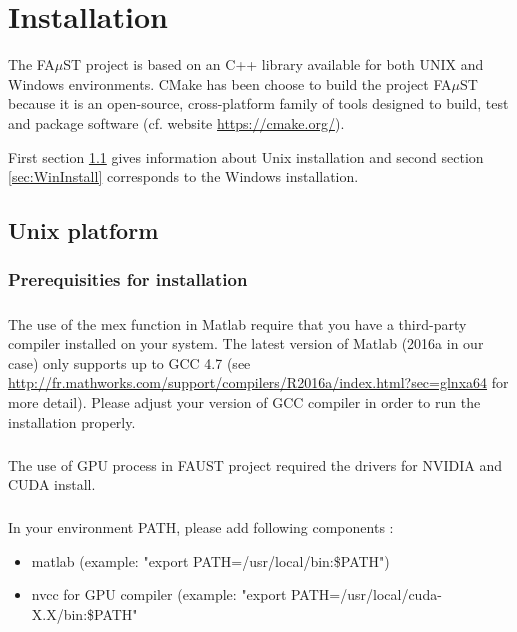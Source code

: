 \chapter{Installation}\label{sec:install}

The FA$\mu$ST project is based on an C++ library available for both UNIX and Windows environments. CMake has been choose to build the project FA$\mu$ST because it is an open-source, cross-platform family of tools designed to build, test and package software (cf. website \url{https://cmake.org/}).

First section \ref{sec:UnixInstall} gives information about Unix installation and second section \ref{sec:WinInstall} corresponds to the Windows installation. 

\section{Unix platform}\label{sec:UnixInstall}

\subsection{Prerequisities for installation}\label{sec:UnixPrerequisitiesInstall}
  

\paragraph{}The use of the mex function in Matlab require that you have a third-party compiler installed on your system. The latest version of Matlab (2016a in our case) only supports up to GCC 4.7 (see \url{http://fr.mathworks.com/support/compilers/R2016a/index.html?sec=glnxa64} for more detail). Please adjust your version of GCC compiler in order to run the installation properly. 

\paragraph{}The use of GPU process in FAUST project required the drivers for NVIDIA and CUDA install.


\paragraph{}In your environment PATH, please add following components :
\begin{itemize}
\item matlab (example: "export PATH=/usr/local/bin:\$PATH")
\item nvcc for GPU compiler (example: "export PATH=/usr/local/cuda-X.X/bin:\$PATH"
\end{itemize}

